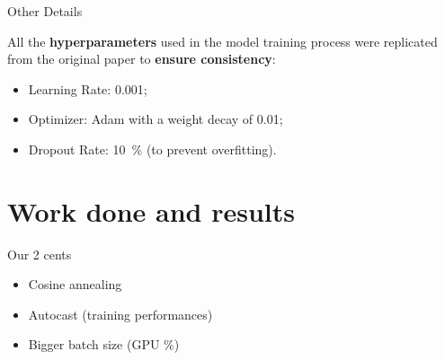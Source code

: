 	\begin{frame}{Other Details}

		All the \textbf{hyperparameters} used in the model training process were replicated from the original paper to
		\textbf{ensure consistency}:

		\begin{itemize}
			\item Learning Rate: \SI{0.001}{};
			\item Optimizer: Adam with a weight decay of \SI{0.01}{};
			\item Dropout Rate: \SI{10}{\percent} (to prevent overfitting).
		\end{itemize}

	\end{frame}

\section[Work done and results]{Work done and results}	

	\begin{frame}{Our 2 cents}

		\begin{itemize}
		\item Cosine annealing
		\item Autocast (training performances)
		\item Bigger batch size (GPU \%)
		\end{itemize}

	\end{frame}

